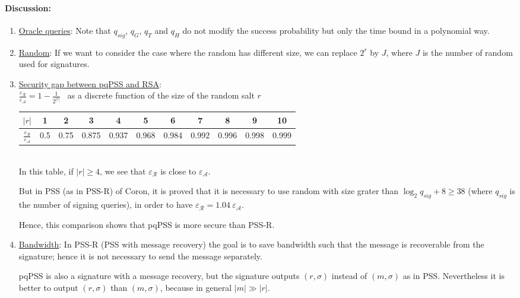 \documentclass[a4paper,11pt]{article}
\begin{document}
\paragraph{Discussion:}
\begin{enumerate}
\item  \underline{Oracle queries}: Note that $q_{sig}$, $q_{G}$, $q_{T}$ and  $q_{H}$ do not modify the success probability but only the time bound in a polynomial way.

 \item \underline{Random}:  If we want to consider the case where the random has different size, we can replace $2^{r}$ by $J$, where $J$ is the number of random used for signatures.

\item  \underline{Security gap between pqPSS and RSA}: \\

$\frac{\varepsilon_{\mathcal{R}}}{\varepsilon_{\mathcal{A}}}=1-\frac{1}{2^{|r|}}$ \ as a discrete function of the size of the random salt $r$ \\

\begin{tabular}{|c|c|c|c|c|c|c|c|c|c|c|}
 \hline  %
  $|r|$ & 1 & 2 & 3 & 4 & 5 & 6 & 7 & 8 & 9  & 10 \\
 \hline
   $\frac{\varepsilon_{\mathcal{R}}}{\varepsilon_{\mathcal{A}}}$ & 0.5 & 0.75 & 0.875 & 0.937 & 0.968 & 0.984 & 0.992 & 0.996 & 0.998 & 0.999 \\
  \hline
\end{tabular}
\\

In this table,  if $|r|\geq 4$, we see that $\varepsilon_{\mathcal{R}}$ is close to $\varepsilon_{\mathcal{A}}$.

But in PSS (as in PSS-R) of Coron, it is proved that it is necessary to use  random with size grater than $\log_{2}q_{sig}+8 \geq 38$  (where $q_{sig}$ is the number of signing queries), in order to have $\varepsilon_{\mathcal{R}}=1.04 \ \varepsilon_{\mathcal{A}}$.

Hence, this comparison shows that pqPSS is more secure than PSS-R.

\item \underline{Bandwidth}: In PSS-R (PSS with message recovery) the goal is to save bandwidth such that the message is recoverable from the signature; hence it is not necessary to send the message separately.

pqPSS is also a signature with a message recovery, but the signature outputs $(r,\sigma)$ instead of $(m,\sigma)$ as in PSS. Nevertheless it is better to output $(r,\sigma)$ than $(m,\sigma)$, because in general $|m|\gg |r|$.



\end{enumerate}
\end{document}
